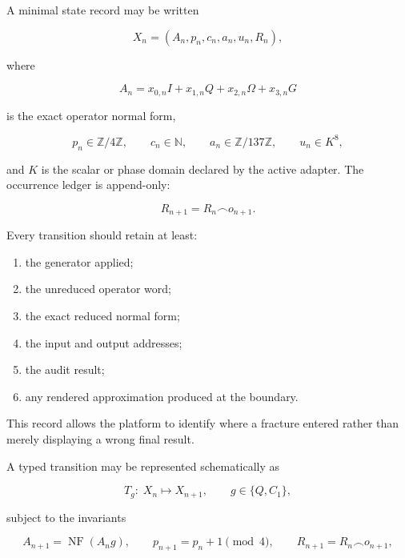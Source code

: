 \documentclass[11pt,letterpaper]{article}
\theoremstyle{clearonyx}
\newcommand{\Z}{\mathbb{Z}}
\newcommand{\N}{\mathbb{N}}
\newcommand{\NF}{\operatorname{NF}}
\newcommand{\Append}{\mathbin{\frown}}
\begin{document}
A minimal state record may be written

\begin{equation}
X_n=\left(A_n,p_n,c_n,a_n,u_n,R_n\right),
\end{equation}

where

\begin{equation}
A_n=x_{0,n}I+x_{1,n}Q+x_{2,n}\Omega+x_{3,n}G
\end{equation}

is the exact operator normal form,

\begin{equation}
p_n\in\Z/4\Z,
\qquad
c_n\in\N,
\qquad
a_n\in\Z/137\Z,
\qquad
u_n\in K^8,
\end{equation}

and $K$ is the scalar or phase domain declared by the active adapter.  The occurrence ledger is append-only:

\begin{equation}
R_{n+1}=R_n\Append o_{n+1}.
\end{equation}

Every transition should retain at least:

\begin{enumerate}
  \item the generator applied;
  \item the unreduced operator word;
  \item the exact reduced normal form;
  \item the input and output addresses;
  \item the audit result;
  \item any rendered approximation produced at the boundary.
\end{enumerate}

This record allows the platform to identify where a fracture entered rather than merely displaying a wrong final result.

A typed transition may be represented schematically as

\begin{equation}
T_g:\;X_n\longmapsto X_{n+1},
\qquad
g\in\{Q,C_1\},
\end{equation}

subject to the invariants

\begin{equation}
A_{n+1}=\NF(A_ng),
\qquad
p_{n+1}=p_n+1\pmod4,
\qquad
R_{n+1}=R_n\Append o_{n+1},
\end{equation}
\end{document}
